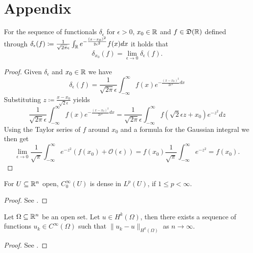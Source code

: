 \chapter*{Appendix}  

\begin{atheorem} \label{athem:delta}
	For the sequence of functionals $\delta_{\epsilon}$ for $\epsilon > 0$, $x_{0} \in \mathbb{R}$ and $f \in \mathfrak{D}(\mathbb{R})$ defined through $\delta_{\epsilon}(f) \coloneqq \frac{1}{\sqrt{2 \pi} \epsilon} \int_{\mathbb{R}} e^{-\frac{(x - x_{0})^{2}}{2 \epsilon^{2}}} f(x) dx$ it holds that  
 		\[ \delta_{x_{0}}(f) = \lim_{\epsilon \rightarrow 0} \delta_{\epsilon}(f). \]
	
	\begin{proof}
		Given $\delta_{\epsilon}$ and $x_{0} \in \mathbb{R}$ we have
			\[ \delta_{\epsilon}(f) = \frac{1}{\sqrt{2 \pi} \epsilon} \int_{-\infty}^{\infty} f(x) e^{-\frac{(x-x_{0})^{2}}{2 \epsilon^{2}} dx} \]
		Substituting $z \coloneqq \frac{x - x_{0}}{\sqrt{2} \epsilon}$ yields
			\[ \frac{1}{\sqrt{2 \pi} \epsilon} \int_{-\infty}^{\infty} f(x) e^{-\frac{(x-x_{0})^{2}}{2 \epsilon^{2}} dx} = \frac{1}{\sqrt{2 \pi} \epsilon} \int_{-\infty}^{\infty} f(\sqrt{2} \epsilon z + x_{0}) e^{-z^{2}} dz \]
		Using the Taylor series of $f$ around $x_{0}$ and a formula for the Gaussian integral we then get
			\[ \lim_{\epsilon \rightarrow 0} \frac{1}{\sqrt{\pi}} \int_{-\infty}^{\infty} e^{-z^{2}} \left( f(x_{0}) + \mathcal{O}(\epsilon) \right) = f(x_{0}) \frac{1}{\sqrt{\pi}} \int_{-\infty}^{\infty} e^{-z^{2}} = f(x_{0}). \]
	\end{proof}
\end{atheorem}

\begin{atheorem}
	For $U \subseteq \mathbb{R}^{n}$ open, $C_{0}^{\infty}(U)$ is dense in $L^{p}(U)$, if $1 \leq p < \infty$.
	
	\begin{proof}
		See \cite[p. 31]{adams2003sobolev}.
	\end{proof}
\end{atheorem}

\begin{atheorem} 
	Let $\Omega \subseteq \mathbb{R}^{n}$ be an open set. Let $u \in H^{k}(\Omega)$, then there exists a sequence of functions $u_{k} \in C^{\infty}(\Omega)$ such that $\| u_{k} - u \|_{H^{k}(\Omega)}$ as $n \rightarrow \infty$.
	
	\begin{proof}
		See \cite[p. 138]{adams2003sobolev}.
	\end{proof}	
\end{atheorem}


